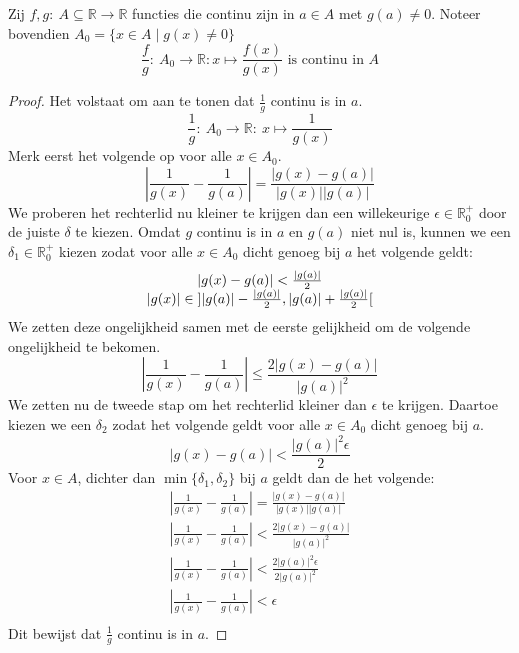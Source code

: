 \documentclass[main.tex]{subfiles}
\begin{document}
\begin{bpr}
  Zij $f,g:\ A \subseteq \mathbb{R} \rightarrow \mathbb{R}$ functies die continu zijn in $a\in A$ met $g(a)\neq 0$.
  Noteer bovendien $A_{0} = \{ x \in A \mid g(x) \neq 0 \}$
  \[ \frac{f}{g}:\ A_{0} \rightarrow \mathbb{R}: x \mapsto \frac{f(x)}{g(x)} \text{ is continu in } A \]

  \begin{proof}
    Het volstaat om aan te tonen dat $\frac{1}{g}$ continu is in $a$.
    \[ \frac{1}{g}:\ A_{0}\rightarrow \mathbb{R}:\ x \mapsto \frac{1}{g(x)} \]
    Merk eerst het volgende op voor alle $x\in A_{0}$.
    \[ \left| \frac{1}{g(x)} - \frac{1}{g(a)} \right| = \frac{|g(x)-g(a)|}{|g(x)||g(a)|} \]
    We proberen het rechterlid nu kleiner te krijgen dan een willekeurige $\epsilon \in \mathbb{R}_{0}^{+}$ door de juiste $\delta$ te kiezen.
    Omdat $g$ continu is in $a$ en $g(a)$ niet nul is, kunnen we een $\delta_{1} \in \mathbb{R}_{0}^{+}$ kiezen zodat voor alle $x\in A_{0}$ dicht genoeg bij $a$ het volgende geldt:
    \[ 
    \begin{array}{c}
      |g(x)-g(a)| < \frac{|g(a)|}{2}\\
      |g(x)| \in \interval[open]{|g(a)|-\frac{|g(a)|}{2}}{|g(a)|+\frac{|g(a)|}{2}}\\
    \end{array}
    \]
    We zetten deze ongelijkheid samen met de eerste gelijkheid om de volgende ongelijkheid te bekomen.
    \[ \left| \frac{1}{g(x)} - \frac{1}{g(a)} \right| \le \frac{2|g(x)-g(a)|}{|g(a)|^{2}} \]
    We zetten nu de tweede stap om het rechterlid kleiner dan $\epsilon$ te krijgen.
    Daartoe kiezen we een $\delta_{2}$ zodat het volgende geldt voor alle $x\in A_{0}$ dicht genoeg bij $a$.
    \[ |g(x)-g(a)| < \frac{|g(a)|^{2}\epsilon}{2} \]
    Voor $x\in A$, dichter dan $\min\{\delta_{1},\delta_{2}\}$ bij $a$ geldt dan de het volgende:
    \[ 
    \begin{array}{c}
      \left| \frac{1}{g(x)} - \frac{1}{g(a)} \right| = \frac{|g(x)-g(a)|}{|g(x)||g(a)|}\\
      \left| \frac{1}{g(x)} - \frac{1}{g(a)} \right| < \frac{2|g(x)-g(a)|}{|g(a)|^{2}}\\
      \left| \frac{1}{g(x)} - \frac{1}{g(a)} \right| < \frac{2|g(a)|^{2}\epsilon}{2|g(a)|^{2}}\\
      \left| \frac{1}{g(x)} - \frac{1}{g(a)} \right| < \epsilon \\
    \end{array}
    \]
    Dit bewijst dat $\frac{1}{g}$ continu is in $a$.
  \end{proof}
\end{bpr}
\end{document}
